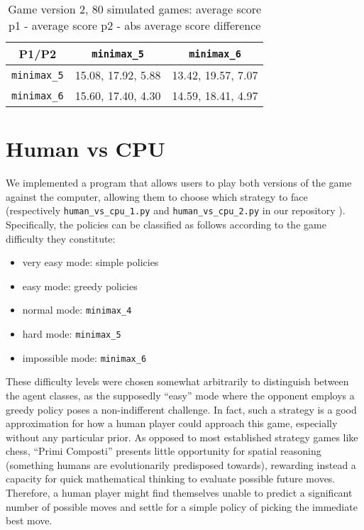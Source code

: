 \documentclass[conference]{IEEEtran}
\begin{document}
\begin{table}[hbt!]
\begin{center}
\begin{tabular}{|c||c|c|}
    \hline
    P1/P2 &  \verb|minimax_5| &  \verb|minimax_6|\\
    \hline \hline
     \verb|minimax_5| & 15.08, 17.92, 5.88 & 13.42, 19.57, 7.07\\
    \hline
     \verb|minimax_6| & 15.60, 17.40, 4.30 & 14.59, 18.41, 4.97 \\
    \hline
\end{tabular}
\caption{Game version 2, 80 simulated games: average score p1 - average score p2 - abs average score difference}
\end{center}
\end{table}


\section{Human vs CPU}

We implemented a program that allows users to play both versions of the game against the computer, allowing them to choose which strategy to face (respectively \verb|human_vs_cpu_1.py| and \verb|human_vs_cpu_2.py| in our repository \cite{repository}). Specifically, the policies can be classified as follows according to the game difficulty they constitute:

\begin{itemize}
    \item very easy mode: simple policies
    \item easy mode: greedy policies
    \item normal mode: \verb|minimax_4|
    \item hard mode: \verb|minimax_5|
    \item impossible mode: \verb|minimax_6|
\end{itemize}

These difficulty levels were chosen somewhat arbitrarily to distinguish between the agent classes, as the supposedly ``easy'' mode where the opponent employs a greedy policy poses a non-indifferent challenge. In fact, such a strategy is a good approximation for how a human player could approach this game, especially without any particular prior. As opposed to most established strategy games like chess, ``Primi Composti'' presents little opportunity for spatial reasoning (something humans are evolutionarily predisposed towards), rewarding instead a capacity for quick mathematical thinking to evaluate possible future moves. Therefore, a human player might find themselves unable to predict a significant number of possible moves and settle for a simple policy of picking the immediate best move.
\end{document}
